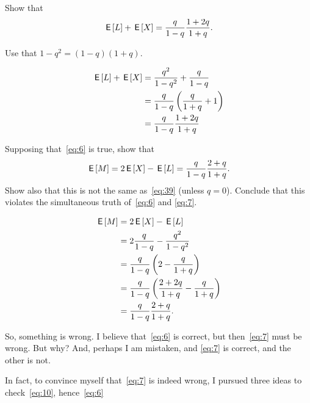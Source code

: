 \documentclass[a4paper,11pt]{article}
\begin{document}
\begin{exercise}
Show that
\begin{equation}
  \label{eq:39}
\,\mathsf{E}\left[L\right] + \,\mathsf{E}\left[X\right] = \frac q{1-q}\frac{1+2q}{1+q}.
\end{equation}
\begin{hint}
Use that $1-q^2=(1-q)(1+q)$.
\end{hint}
\begin{solution}
  \begin{align}
    \label{eq:2}
\,\mathsf{E}\left[L\right]     + \,\mathsf{E}\left[X\right]
&= \frac{q^{2}}{1-q^2} + \frac{q}{1-q} \\
&= \frac q{1-q}\left(\frac{q}{1+q} + 1\right)\\
&= \frac q{1-q} \frac{1+2q}{1+q}
  \end{align}
\end{solution}
\end{exercise}

\begin{exercise}
Supposing that~\cref{eq:6} is true, show that
\begin{equation}
  \label{eq:10}
\,\mathsf{E}\left[M\right] = 2\,\mathsf{E}\left[X\right]  -\,\mathsf{E}\left[L\right] = \frac q{1-q} \frac{2+q}{1+q}.
\end{equation}
Show also that this is not the same as~\cref{eq:39} (unless $q=0$).
Conclude that this violates the simultaneous truth of~\cref{eq:6} and \cref{eq:7}.
\begin{solution}
  \begin{align}
    \label{eq:11}
\,\mathsf{E}\left[M\right]
&= 2\,\mathsf{E}\left[X\right] - \,\mathsf{E}\left[L\right] \\
&= 2\frac q{1-q}  - \frac{q^2}{1-q^2}\\
&= \frac q{1-q}\left(2  - \frac{q}{1+q}\right)\\
&= \frac q{1-q}\left(\frac{2+2q}{1+q}  - \frac{q}{1+q}\right)\\
&= \frac q{1-q}\frac{2+q}{1+q}.
  \end{align}
\end{solution}
\end{exercise}


So, something is wrong.
I believe that~\cref{eq:6} is correct, but then~\cref{eq:7} must be wrong.
But why?
And, perhaps I am mistaken, and \cref{eq:7} is correct, and the other is not.

In fact, to convince myself that~\cref{eq:7} is indeed wrong, I pursued three ideas to check~\cref{eq:10}, hence~\cref{eq:6}
\end{document}
